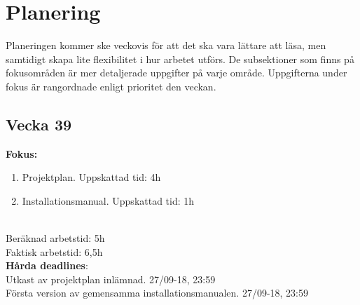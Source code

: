 \documentclass{TDP003mall}
\begin{document}
\newpage

\section{Planering}
Planeringen kommer ske veckovis för att det ska vara lättare att läsa, men samtidigt skapa lite flexibilitet i hur arbetet utförs.
De subsektioner som finns på fokusområden är mer detaljerade uppgifter på varje område. Uppgifterna under fokus är
rangordnade enligt prioritet den veckan.

\subsection{Vecka 39}
\textbf{Fokus:}
\begin{enumerate}
    \item Projektplan. Uppskattad tid: 4h
    \item Installationsmanual. Uppskattad tid: 1h
\end{enumerate}
\\
Beräknad arbetstid: 5h\\
Faktisk arbetstid: 6,5h\\

\textbf{Hårda deadlines}:\\
Utkast av projektplan inlämnad. 27/09-18, 23:59\\
Första version av gemensamma installationsmanualen. 27/09-18, 23:59\\
\end{document}
